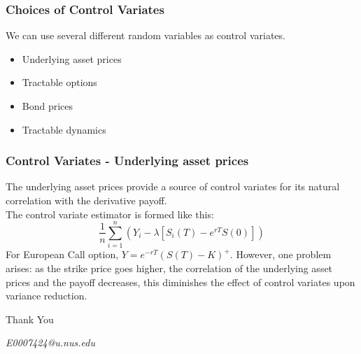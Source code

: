 \documentclass{beamer}
\begin{document}
\begin{frame}
\frametitle{Choices of Control Variates}
We can use several different random variables as control variates.
\begin{itemize}
	\item Underlying asset prices
	\item Tractable options
	\item Bond prices
	\item Tractable dynamics
\end{itemize}
\end{frame}

\begin{frame}
\frametitle{Control Variates - Underlying asset prices}
The underlying asset prices provide a source of control variates for its natural correlation with the derivative payoff.\\
The control variate estimator is formed like this:
$$ \frac{1}{n}\sum_{i=1}^{n}(Y_{i}-\lambda[S_{i}(T)-e^{rT}S(0)])$$
For European Call option, $Y = e^{-rT}(S(T)-K)^{+}$.
However, one problem arises: as the strike price goes higher, the correlation of the underlying asset prices and the payoff decreases, this diminishes the effect of control variates upon variance reduction.
\end{frame}

\begin{frame}
\Huge{\centerline{Thank You}}
\begin{center}
\begin{normalsize}
\emph{E0007424@u.nus.edu}
\end{normalsize}
\end{center}
\end{frame}

\end{document}
